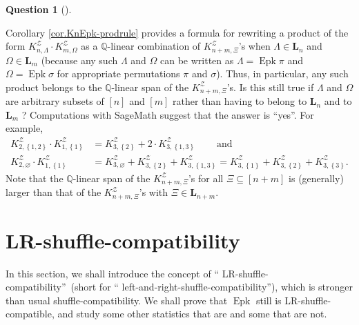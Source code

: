 \documentclass[numbers=enddot,12pt,final,onecolumn,notitlepage]{scrartcl}%
\theoremstyle{definition}
\newtheorem{quest}[theo]{Question}
\newenvironment{question}[1][]
{\begin{quest}[#1]\begin{leftbar}}
{\end{leftbar}\end{quest}}
\newenvironment{question}[1][Question]{\noindent\textbf{#1.} }{\ \rule{0.5em}{0.5em}}
\begin{document}
\begin{question}
Corollary \ref{cor.KnEpk-prodrule} provides a formula for rewriting a product
of the form $K_{n,\Lambda}^{\mathcal{Z}}\cdot K_{m,\Omega}^{\mathcal{Z}}$ as a
$\mathbb{Q}$-linear combination of $K_{n+m,\Xi}^{\mathcal{Z}}$'s when
$\Lambda\in\mathbf{L}_{n}$ and $\Omega\in\mathbf{L}_{m}$ (because any such
$\Lambda$ and $\Omega$ can be written as $\Lambda=\operatorname{Epk}\pi$ and
$\Omega=\operatorname{Epk}\sigma$ for appropriate permutations $\pi$ and
$\sigma$). Thus, in particular, any such product belongs to the $\mathbb{Q}%
$-linear span of the $K_{n+m,\Xi}^{\mathcal{Z}}$'s. Is this still true if
$\Lambda$ and $\Omega$ are arbitrary subsets of $\left[  n\right]  $ and
$\left[  m\right]  $ rather than having to belong to $\mathbf{L}_{n}$ and to
$\mathbf{L}_{m}$ ? Computations with SageMath suggest that the answer is
\textquotedblleft yes\textquotedblright. For example,%
\begin{align*}
K_{2,\left\{  1,2\right\}  }^{\mathcal{Z}}\cdot K_{1,\left\{  1\right\}
}^{\mathcal{Z}}  & =K_{3,\left\{  2\right\}  }^{\mathcal{Z}}+2\cdot
K_{3,\left\{  1,3\right\}  }^{\mathcal{Z}}\ \ \ \ \ \ \ \ \ \ \text{and}\\
K_{2,\varnothing}^{\mathcal{Z}}\cdot K_{1,\left\{  1\right\}  }^{\mathcal{Z}}
& =K_{3,\varnothing}^{\mathcal{Z}}+K_{3,\left\{  2\right\}  }^{\mathcal{Z}%
}+K_{3,\left\{  1,3\right\}  }^{\mathcal{Z}}=K_{3,\left\{  1\right\}
}^{\mathcal{Z}}+K_{3,\left\{  2\right\}  }^{\mathcal{Z}}+K_{3,\left\{
3\right\}  }^{\mathcal{Z}}.
\end{align*}
Note that the $\mathbb{Q}$-linear span of the $K_{n+m,\Xi}^{\mathcal{Z}}$'s
for all $\Xi\subseteq\left[  n+m\right]  $ is (generally) larger than that of
the $K_{n+m,\Xi}^{\mathcal{Z}}$'s with $\Xi\in\mathbf{L}_{n+m}$.
\end{question}

\section{\label{sect.LR}LR-shuffle-compatibility}

In this section, we shall introduce the concept of \textquotedblleft
LR-shuffle-compatibility\textquotedblright\ (short for \textquotedblleft
left-and-right-shuffle-compatibility\textquotedblright), which is stronger
than usual shuffle-compatibility. We shall prove that $\operatorname{Epk}$
still is LR-shuffle-compatible, and study some other statistics that are and
some that are not.
\end{document}
